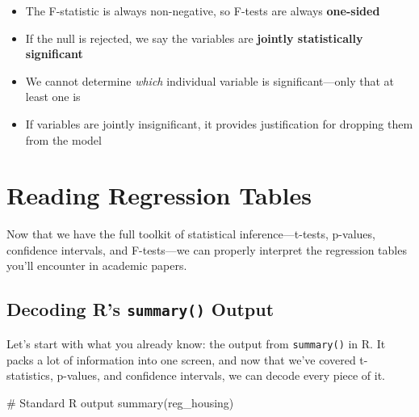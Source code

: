 \documentclass[
  letterpaper,
  DIV=11,
  numbers=noendperiod]{scrreprt}
\newenvironment{Shaded}{\begin{snugshade}}{\end{snugshade}}
\newcommand{\CommentTok}[1]{\textcolor[rgb]{0.37,0.37,0.37}{#1}}
\newcommand{\FunctionTok}[1]{\textcolor[rgb]{0.28,0.35,0.67}{#1}}
\newcommand{\NormalTok}[1]{\textcolor[rgb]{0.00,0.23,0.31}{#1}}
\providecommand{\tightlist}{%
  \setlength{\itemsep}{0pt}\setlength{\parskip}{0pt}}
\begin{document}
\begin{tcolorbox}[enhanced jigsaw, arc=.35mm, bottomrule=.15mm, bottomtitle=1mm, breakable, colback=white, colbacktitle=quarto-callout-note-color!10!white, colframe=quarto-callout-note-color-frame, coltitle=black, left=2mm, leftrule=.75mm, opacityback=0, opacitybacktitle=0.6, rightrule=.15mm, title=\textcolor{quarto-callout-note-color}{\faInfo}\hspace{0.5em}{Properties of the F-Test}, titlerule=0mm, toprule=.15mm, toptitle=1mm]

\begin{itemize}
\tightlist
\item
  The F-statistic is always non-negative, so F-tests are always
  \textbf{one-sided}
\item
  If the null is rejected, we say the variables are \textbf{jointly
  statistically significant}
\item
  We cannot determine \emph{which} individual variable is
  significant---only that at least one is
\item
  If variables are jointly insignificant, it provides justification for
  dropping them from the model
\end{itemize}

\end{tcolorbox}

\section{Reading Regression Tables}\label{reading-regression-tables}

Now that we have the full toolkit of statistical inference---t-tests,
p-values, confidence intervals, and F-tests---we can properly interpret
the regression tables you'll encounter in academic papers.

\subsection{\texorpdfstring{Decoding R's \texttt{summary()}
Output}{Decoding R's summary() Output}}\label{decoding-rs-summary-output}

Let's start with what you already know: the output from
\texttt{summary()} in R. It packs a lot of information into one screen,
and now that we've covered t-statistics, p-values, and confidence
intervals, we can decode every piece of it.

\begin{Shaded}
\begin{Highlighting}[]
\CommentTok{\# Standard R output}
\FunctionTok{summary}\NormalTok{(reg\_housing)}
\end{Highlighting}
\end{Shaded}
\end{document}
